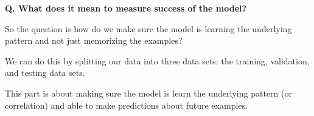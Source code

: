 \begin{frame}[fragile, label={distance}]{\textbf{Q. What does it mean to measure success of the model?}}
  \begin{wideitemize}
    \item So the question is how do we make sure the model is learning the underlying pattern
    and not just memorizing the examples?
    \item We can do this by splitting our data into three data sets: the training, validation,
    and testing data sets.\medskip
    \begin{wideitemize}
      \item This part is about making sure the model is learn the underlying pattern
      (or correlation) and able to make predictions about future examples.
    \end{wideitemize}
  \end{wideitemize}
\end{frame}



